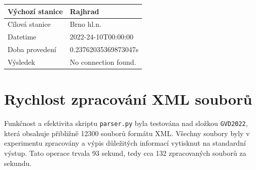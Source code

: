 \documentclass[10pt,xcolor=pdflatex,dvipsnames,table,oneside]{book}
\begin{document}
\vspace{1em}
\begin{tabular}{|l|l|}
    \hline
    Výchozí stanice & Rajhrad \\
    \hline
    Cílová stanice & Brno hl.n. \\
    \hline
    Datetime & 2022-24-10T00:00:00 \\
    \hline
    Doba provedení & 0.23762035369873047s \\
    \hline
    Výsledek & No connection found. \\
    \hline
\end{tabular}

\section{Rychlost zpracování XML souborů}
Funkčnost a efektivita skriptu \verb|parser.py| byla testována nad složkou \verb|GVD2022|, která obsahuje přibližně 12300 souborů formátu XML. Všechny soubory byly v experimentu zpracovány a výpis důležitých informací vytisknut na standardní výstup. Tato operace trvala 93 sekund, tedy cca 132 zpracovaných souborů za sekundu.
\end{document}
